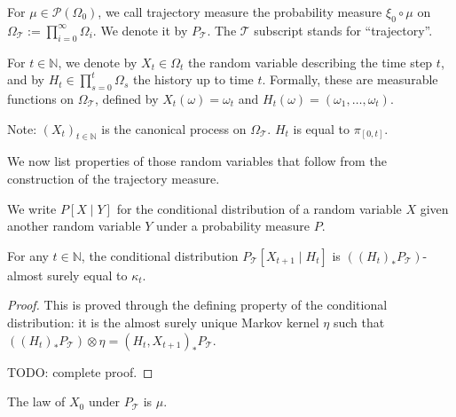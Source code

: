 \begin{definition}\label{def:trajMeasure}
  \leanok
For $\mu \in \mathcal{P}(\Omega_0)$, we call trajectory measure the probability measure $\xi_0 \circ \mu$ on $\Omega_{\mathcal{T}} := \prod_{i=0}^{\infty} \Omega_i$.
We denote it by $P_{\mathcal{T}}$.
The $\mathcal{T}$ subscript stands for ``trajectory''.
\end{definition}


\begin{definition}\label{def:history}
  \mathlibok %
For $t \in \mathbb{N}$, we denote by $X_t \in \Omega_t$ the random variable describing the time step $t$, and by $H_t \in \prod_{s=0}^t \Omega_s$ the history up to time $t$.
Formally, these are measurable functions on $\Omega_{\mathcal{T}}$, defined by $X_t(\omega) = \omega_t$ and $H_t(\omega) = (\omega_1, \ldots, \omega_t)$.
\end{definition}

Note: $(X_t)_{t \in \mathbb{N}}$ is the canonical process on $\Omega_{\mathcal{T}}$. $H_t$ is equal to $\pi_{[0,t]}$.

We now list properties of those random variables that follow from the construction of the trajectory measure.

We write $P[X \mid Y]$ for the conditional distribution of a random variable $X$ given another random variable $Y$ under a probability measure $P$.

\begin{lemma}\label{lem:condDistrib_X_add_one}
  \leanok
For any $t \in \mathbb{N}$, the conditional distribution $P_{\mathcal{T}}\left[X_{t+1} \mid H_t\right]$ is $((H_t)_* P_{\mathcal{T}})$-almost surely equal to $\kappa_t$.
\end{lemma}

\begin{proof}\leanok
This is proved through the defining property of the conditional distribution: it is the almost surely unique Markov kernel $\eta$ such that $((H_t)_* P_{\mathcal{T}}) \otimes \eta = (H_t, X_{t+1})_*P_{\mathcal{T}}$.

TODO: complete proof.
\end{proof}


\begin{lemma}\label{lem:law_X_zero}
The law of $X_0$ under $P_{\mathcal{T}}$ is $\mu$.
\end{lemma}

